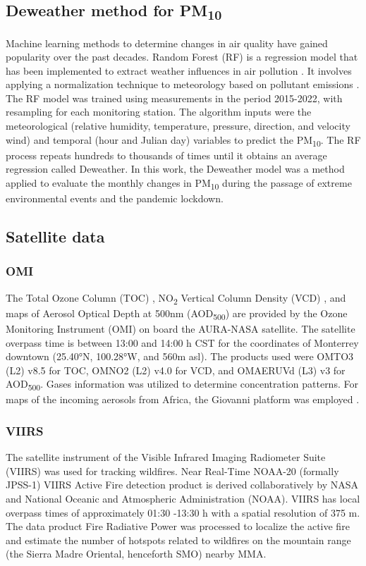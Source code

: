 \documentclass[preprint,12pt]{elsarticle}
\begin{document}
\subsection{Deweather method for PM\textsubscript{10}}
Machine learning methods to determine changes in air quality have gained popularity over the past decades. Random Forest (RF) is a regression model that has been implemented to extract weather influences in air pollution \citep{Breiman_2001,Vu_2019,Cole_2020}. It involves applying a normalization technique to meteorology based on pollutant emissions \citep{Stuart_2019,Zongbo_2021,Lv_2022}. The RF model was trained using measurements in the period 2015-2022, with resampling for each monitoring station. The algorithm inputs were the meteorological (relative humidity, temperature, pressure, direction, and velocity wind) and temporal (hour and Julian day) variables to predict the PM\textsubscript{10}. The RF process repeats hundreds to thousands of times until it obtains an average regression called Deweather. In this work, the Deweather model was a method applied to evaluate the monthly changes in PM\textsubscript{10} during the passage of extreme environmental events and the pandemic lockdown.
\subsection{Satellite data}
\subsubsection{OMI}
The Total Ozone Column (TOC) \citep{dcio}, NO\textsubscript{2} Vertical Column Density (VCD) \citep{Lamsal_2020}, and maps of Aerosol Optical Depth at 500nm (AOD\textsubscript{500}) are provided by the Ozone Monitoring Instrument (OMI) on board the AURA-NASA satellite. The satellite overpass time is between 13:00 and 14:00 h CST for the coordinates of Monterrey downtown (25.40°N, 100.28°W, and 560m asl). The products used were OMTO3 (L2) v8.5 for TOC, OMNO2 (L2) v4.0 for VCD, and OMAERUVd (L3) v3 for AOD\textsubscript{500}. Gases information was utilized to determine concentration patterns. For maps of the incoming aerosols from Africa, the Giovanni platform was employed \citep{torres2008}.
\subsubsection{VIIRS}
The satellite instrument of the Visible Infrared Imaging Radiometer Suite (VIIRS) \citep{Schroeder_2014} was used for tracking wildfires. Near Real-Time NOAA-20 (formally JPSS-1) VIIRS Active Fire detection product is derived collaboratively by NASA and National Oceanic and Atmospheric Administration (NOAA). VIIRS has local overpass times of approximately 01:30 -13:30 h with a spatial resolution of 375 m. The data product Fire Radiative Power \citep{earthdata} was processed to localize the active fire and estimate the number of hotspots related to wildfires on the mountain range (the Sierra Madre Oriental, henceforth SMO) nearby MMA.
\end{document}

